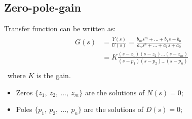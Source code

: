 \subsection{Zero-pole-gain}
Transfer function can be written as:
\begin{align*}
\begin{split}
    G(s)
    &=\frac{Y(s)}{U(s)}=\frac{b_{m} s^{m}+...+b_{1} s +b_{0}}{a_{n} s^{n}+...+a_{1} s+a_{0}}\\
    &=\boxed{K\frac{(s-z_{1})(s-z_{2})...(s-z_{m})}{(s-p_{1})(s-p_{2})...(s-p_{n})}}\\
\end{split}
\end{align*}
\ where $K$ is the gain.

 \begin{itemize}
      \item Zeros $\{z_{1} , \ z_{2}, \ ..., \ z_{m}\}$ are the solutions of $N(s)=0$;
      \item Poles $\{p_{1} , \ p_{2}, \ ..., \ p_{n}\}$ are the solutions of $D(s)=0$;
 \end{itemize}


